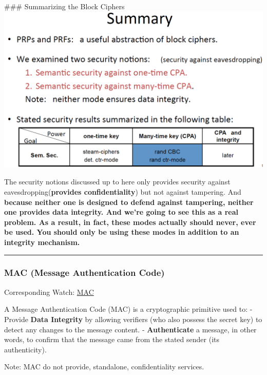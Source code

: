 \documentclass[11pt]{article}
\makeatletter
\def\maxwidth{\ifdim\Gin@nat@width>\linewidth\linewidth
    \else\Gin@nat@width\fi}
\let\Oldincludegraphics\includegraphics
\renewcommand{\includegraphics}[1]{\Oldincludegraphics[width=.8\maxwidth]{#1}}
\makeatother
\begin{document}
 \#\#\# Summarizing the Block Ciphers
\includegraphics{./Images/BlockCipherSummary.png}

The security notions discussed up to here only provides security against
eavesdropping(\textbf{provides confidentiality}) but not against
tampering. And \textbf{because neither one is designed to defend against
tampering, neither one provides data integrity. And we're going to see
this as a real problem. As a result, in fact, these modes actually
should never, ever be used. You should only be using these modes in
addition to an integrity mechanism.}

\begin{center}\rule{0.5\linewidth}{\linethickness}\end{center}

    \hypertarget{mac-message-authentication-code}{%
\subsubsection{MAC (Message Authentication
Code)}\label{mac-message-authentication-code}}

Corresponding Watch:
\href{https://www.coursera.org/learn/crypto/lecture/iVGR5/message-authentication-codes}{MAC}

A Message Authentication Code (MAC) is a cryptographic primitive used
to: - Provide \textbf{Data Integrity} by allowing verifiers (who also
possess the secret key) to detect any changes to the message content. -
\textbf{Authenticate} a message, in other words, to confirm that the
message came from the stated sender (its authenticity).

Note: MAC do not provide, standalone, confidentiality services.
\end{document}
